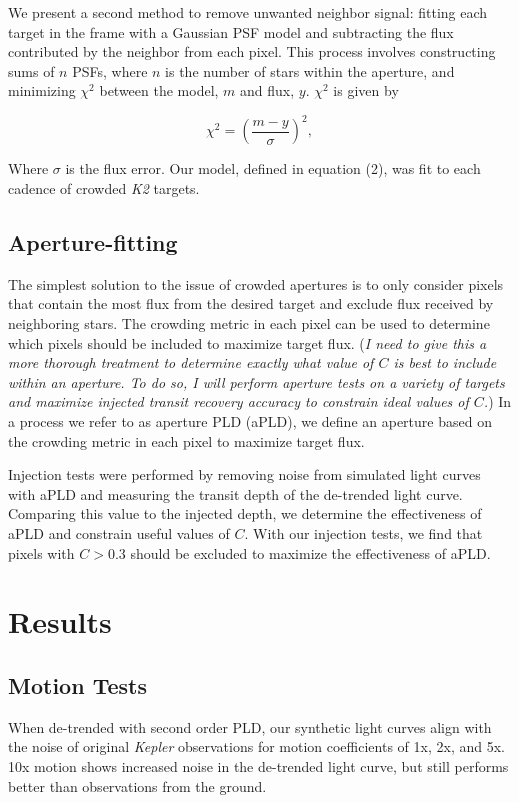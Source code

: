 \documentclass[12pt,preprint]{aastex}
\begin{document}
We present a second method to remove unwanted neighbor signal: fitting each target in the frame with a Gaussian PSF model and subtracting the flux contributed by the neighbor from each pixel. This process involves constructing sums of $n$ PSFs, where $n$ is the number of stars within the aperture, and minimizing $\chi^2$ between the model, $m$ and flux, $y$. $\chi^2$ is given by

\[
\tag{5}
\chi^2 = \left( \frac{m-y}{\sigma} \right)^2,
\]

Where $\sigma$ is the flux error. Our model, defined in equation (2), was fit to each cadence of crowded \textit{K2} targets.

\subsection{Aperture-fitting}

The simplest solution to the issue of crowded apertures is to only consider pixels that contain the most flux from the desired target and exclude flux received by neighboring stars. The crowding metric in each pixel can be used to determine which pixels should be included to maximize target flux. (\textit{I need to give this a more thorough treatment to determine exactly what value of $C$ is best to include within an aperture. To do so, I will perform aperture tests on a variety of targets and maximize injected transit recovery accuracy to constrain ideal values of $C$.}) In a process we refer to as aperture PLD (aPLD), we define an aperture based on the crowding metric in each pixel to maximize target flux.

Injection tests were performed by removing noise from simulated light curves with aPLD and measuring the transit depth of the de-trended light curve. Comparing this value to the injected depth, we determine the effectiveness of aPLD and constrain useful values of $C$. With our injection tests, we find that pixels with $C>0.3$ should be excluded to maximize the effectiveness of aPLD.

\section{Results}

\subsection{Motion Tests}

When de-trended with second order PLD, our synthetic light curves align with the noise of original \textit{Kepler} observations for motion coefficients of 1x, 2x, and 5x. 10x motion shows increased noise in the de-trended light curve, but still performs better than observations from the ground.
\end{document}
